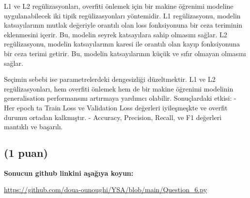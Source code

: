 \documentclass[11pt]{article}
\begin{document}
L1 ve L2 regülizasyonları, overfiti önlemek için bir makine öğrenimi modeline uygulanabilecek iki tipik regülizasyonları yöntemidir.
L1 regülizasyonu, modelin katsayılarının mutlak değeriyle orantılı olan loss fonksiyonuna bir ceza teriminin eklenmesini içerir. Bu, modelin seyrek katsayılara sahip olmasını sağlar. 
L2 regülizasyonu, modelin katsayılarının karesi ile orantılı olan kayıp fonksiyonuna bir ceza terimi getirir. Bu, modelin katsayılarının küçük ve sıfır olmayan olmasını sağlar. 

Seçimin sebebi ise parametrelerdeki dengesizliği düzeltmektir. L1 ve L2 regülizasyonları, hem overfiti önlemek hem de bir makine öğrenimi modelinin generalisation performansını artırmaya yardımcı olabilir. 
Sonuçlardaki etkisi: 
- Her epoch ta Train Loss ve Validation Loss değerleri iyileşmeşkte ve overfit durumu ortadan kalkmıştır.
- Accuracy, Precision, Recall, ve F1 değerleri mantıklı ve başarılı.

\subsection{(1 puan)} \textbf{Sonucun github linkini  aşağıya koyun:}

\url{https://github.com/doua-ounoughi/YSA/blob/main/Question_6.py}
\end{document}
